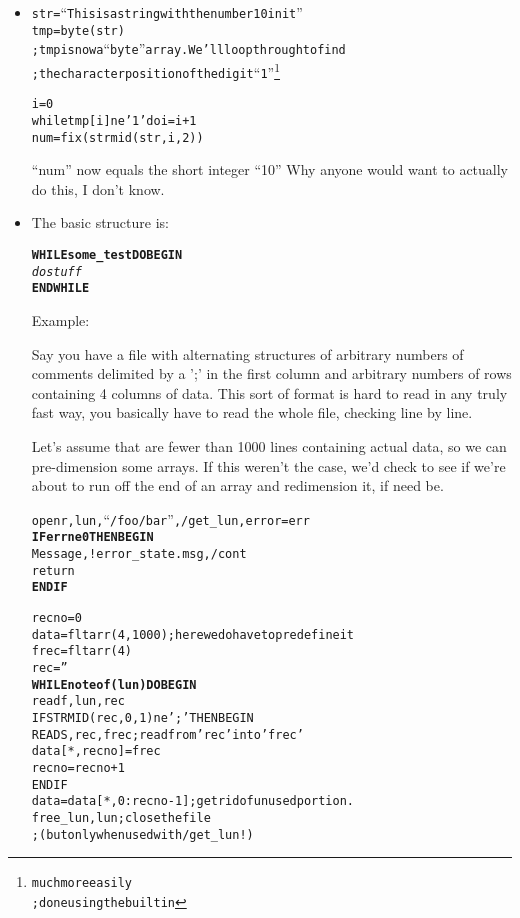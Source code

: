     \begin{itemize}
      \item {}

\begin{alltt}
 str = ``This is a string with the number 10 in it''
 tmp=byte(str)
 ; tmp is now a ``byte'' array. We'll loop through to find 
 ; the character position of the digit ``1''\footnote{much more easily
 ;   done using the builtin  }

 i=0
 while tmp[i] ne '1' do i=i+1
 num=fix(strmid( str,i,2))

\end{alltt}

         ``num'' now equals the short integer ``10''
          Why anyone would want to actually do this, I don't know.
        
      \item {}

        The basic structure is:


\begin{alltt}

\textbf{WHILE some\_test DO BEGIN}
  \textit{do stuff}
\textbf{ENDWHILE}

\end{alltt}

        Example: 

        Say you have a file with alternating structures of arbitrary
        numbers of comments delimited by a ';' in the first column and
        arbitrary numbers of rows containing 4 columns of data. This
        sort of format is hard to read in any truly fast way, you basically
        have to read the whole file, checking line by line.

        Let's assume that are fewer than 1000 lines containing actual
        data, so we can pre-dimension some arrays. If this weren't the
        case, we'd check to see if we're about to run off the end of an
        array and redimension it, if need be.

\begin{alltt}

openr, lun, ``/foo/bar'', /get_lun, error=err
\textbf{IF err ne 0 THEN BEGIN }
  Message,!error_state.msg,/cont
  return
\textbf{ENDIF }
  
recno=0
data=fltarr(4,1000) ; here we do have to predefine it
frec=fltarr(4)
rec=''
\textbf{WHILE not eof(lun) DO BEGIN}
  readf, lun, rec
  IF STRMID(rec,0,1) ne ';' THEN BEGIN
    READS,rec,frec; read from 'rec' into 'frec'
    data[*,recno] = frec
    recno=recno+1
  ENDIF
data=data[*,0:recno-1] ; get rid of unused portion.
free_lun, lun ; close the file 
              ; (but only when used with /get_lun!)

\end{alltt}

    \end{itemize}


